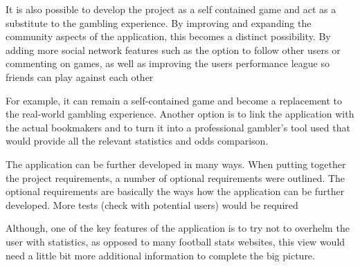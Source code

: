 It is also possible to develop the project as a self contained game and act as a substitute to the gambling experience.  By improving and expanding the community aspects of the application, this becomes a distinct possibility. By adding more social network features such as the option to follow other users or commenting on games, as well as improving the users performance league so friends can play against each other


For example, it can remain a self-contained game and become a replacement to the real-world gambling experience. Another option is to link the application with the actual bookmakers and to turn it into a professional gambler's tool used that would provide all the relevant statistics and odds comparison.

The application can be further developed in many ways. 
When putting together the project requirements, a number of optional requirements were outlined. The optional requirements are basically the ways how the application can be further developed. More tests (check with potential users) would be required

Although, one of the key features of the application is to try not to overhelm the user with statistics, as opposed to many football stats websites, this view would need a little bit more additional information to complete the big picture.

